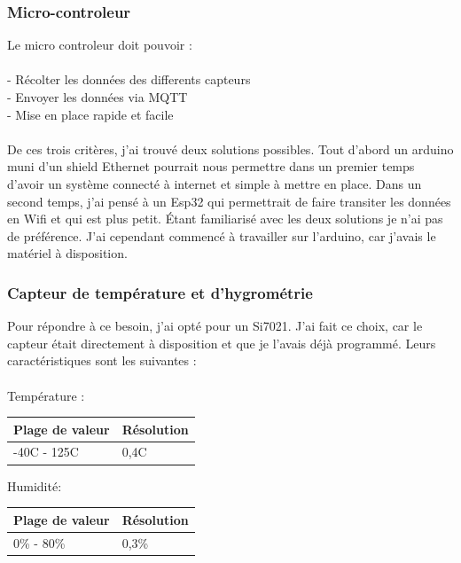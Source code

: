 \documentclass[12pt]{article}
\begin{document}
\subsubsection{Micro-controleur}
Le micro controleur doit pouvoir :\\
\\
	- Récolter les données des differents capteurs\\
	- Envoyer les données via MQTT\\
	- Mise en place rapide et facile\\
	\\
De ces trois critères, j'ai trouvé deux solutions possibles. 
Tout d'abord un arduino muni d'un shield Ethernet pourrait nous permettre dans un premier temps d'avoir un système 
connecté à internet et simple à mettre en place.
Dans un second temps, j'ai pensé à un Esp32 qui permettrait de faire transiter les données en Wifi et qui est plus petit. 
Étant familiarisé avec les deux solutions je n'ai pas de préférence. J'ai cependant commencé à travailler sur l'arduino, car j'avais
le matériel à disposition.

\subsubsection{Capteur de température et d'hygrométrie }
Pour répondre à ce besoin, j'ai opté pour un Si7021. J'ai fait ce choix, car le capteur était directement à disposition et que je l'avais déjà programmé. Leurs caractéristiques sont les suivantes :\\
\\
Température :\\
\begin{center}
    \begin{tabular}{|l|l|}
	\hline
	    Plage de valeur & Résolution \\
	\hline
	    -40C - 125C & 0,4C \\
	\hline
    \end{tabular}
\end{center}
Humidité:\\
\begin{center}
    \begin{tabular}{|l|l|}
	\hline
	    Plage de valeur & Résolution \\
	\hline
	    0\% - 80\% & 0,3\% \\
	\hline
    \end{tabular}
\end{center}
\end{document}
